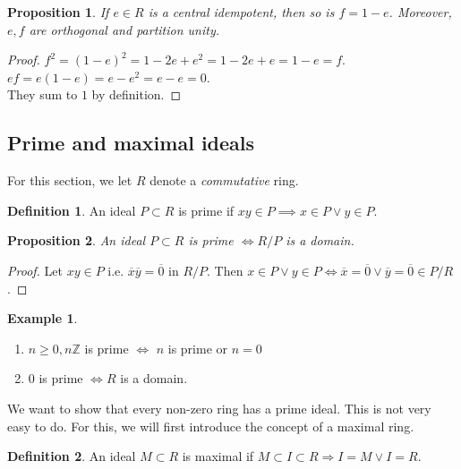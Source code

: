 \documentclass{article}
\newcommand\Z{\ensuremath{\mathbb{Z}}}
\theoremstyle{definition}
\newtheorem{definition}{Definition}[subsection]
\newtheorem{eg}{Example}[subsection]
\theoremstyle{remark}
\theoremstyle{plain}
\newtheorem{prop}{Proposition}[subsection]
\begin{document}
    \begin{prop}
        If \(e \in R\) is a central idempotent, then so is \(f = 1-e\).  Moreover, \(e,f\) are orthogonal and partition unity.
    \end{prop}
    \begin{proof}
        \(f^2 = (1-e)^2 = 1 - 2e + e^2 = 1 -2e + e = 1-e = f\).\\ 
        \(ef = e(1-e) = e - e^2 = e-e = 0\). \\
        They sum to \(1\) by definition.
    \end{proof}
    
    \subsection{Prime and maximal ideals}

    For this section, we let \(R\) denote a \textit{commutative} ring. 

    \begin{definition}
        An ideal \(P \subset R\) is prime if \(xy \in P \implies x\in P \lor y \in P\).
    \end{definition}

    \begin{prop}
        An ideal \(P \subset R\) is prime \(\iff R/P\) is a domain.
    \end{prop}
    \begin{proof}
        Let \(xy \in P\) i.e. \(\overline{x}\overline{y} = \overline{0}\) in \(R/P\). Then \(x\in P \lor y\in P \iff \overline{x} = \overline{0} \lor \overline{y} = \overline{0} \in P/R\).
    \end{proof}

    \begin{eg}
        \begin{enumerate}
            \item \(n \geq 0, n\Z\) is prime \(\iff\) \(n\) is prime or \(n = 0\)
            \item \(0\) is prime \(\iff R\) is a domain. 
        \end{enumerate}
    \end{eg}

    We want to show that every non-zero ring has a prime ideal. 
    This is not very easy to do. For this, we will first introduce the concept of a maximal ring. 

    \begin{definition}
        An ideal \(M \subset R\) is maximal if \(M\subset I\subset R \Rightarrow I = M \lor I=R\).
    \end{definition}
\end{document}
